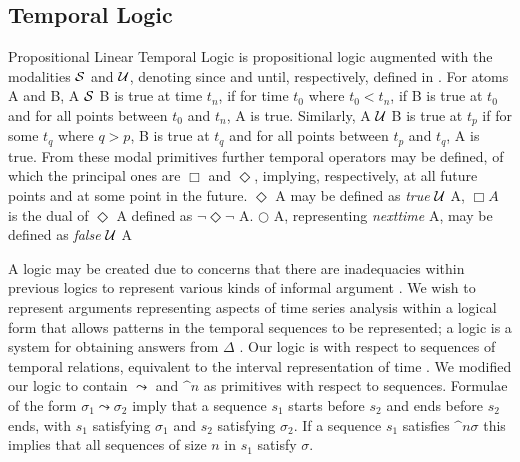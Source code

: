 \subsection{Temporal Logic}
Propositional Linear Temporal Logic is propositional logic augmented
with the modalities ${\cal S}$ and ${\cal U}$, denoting since and
until, respectively, defined in \cite{ghr94}. For atoms A and B, A ${\cal S}$ B is true at time $t_n$,
if for time $t_0$ where $t_0 < t_n$, if B is true at $t_0$ and for all
points between $t_0$ and $t_n$, A is true. Similarly, A ${\cal U}$ B
is true at $t_p$ if for some $t_q$ where $q > p$, B is true at $t_q$
and for all points between $t_p$ and $t_q$, A is true. 
From these modal primitives further temporal
operators may be defined, of which the principal ones are $\Box$ and
$\Diamond$, implying, respectively, at all future points and at some
point in the future. 
$\Diamond$ A may be defined as {\em true} ${\cal U}$ A, $\Box A$ is the dual
of $\Diamond$ A defined as $\neg \Diamond \neg$ A.  $\bigcirc$ A,
representing {\em nexttime} A, may be defined as {\em false} ${\cal U}$ A
\medskip

A logic may be created due to concerns that there are inadequacies
within previous logics to represent various kinds of informal argument
\cite{haa78}. We wish to represent arguments representing aspects of
time series analysis within a logical form that allows patterns in the
temporal sequences to be represented; a logic is a system for
obtaining answers from $\Delta$ \cite{ghr94}. Our logic is with respect to
sequences of temporal relations, equivalent to the interval
representation of time \cite{all84}.
We modified our logic to contain $\leadsto$ and $\bm^n$ as primitives
with respect to sequences. Formulae of the form $\sigma_1 \leadsto
\sigma_2$ imply that a sequence $s_1$ starts before $s_2$ and
ends before $s_2$ ends, with $s_1$ satisfying $\sigma_1$ and $s_2$
satisfying $\sigma_2$. If a sequence $s_1$ satisfies $\bm^n \sigma$
this implies that all sequences of size $n$ in $s_1$ satisfy
$\sigma$. 

\medskip

